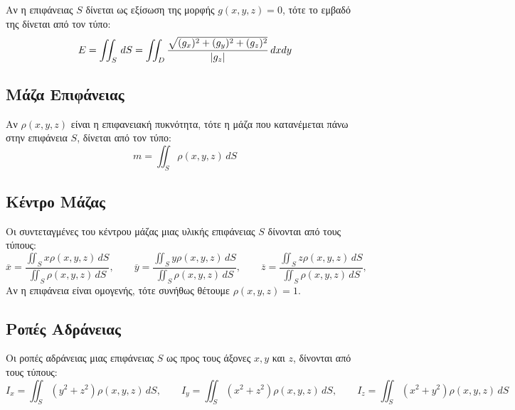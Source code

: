 Αν η επιφάνειας $S$ δίνεται ως εξίσωση της μορφής $ g(x,y,z) = 0 $, τότε το εμβαδό της 
δίνεται από τον τύπο:
\[
  E = \iint_{S} \,{dS} = \iint_{D} \frac{\sqrt{(g_{x})^{2} + (g_{y})^{2}+(g_{z})^{2}}}
  {\abs{g_{z}}} \,{dx} {dy} 
\]

\subsection*{Μάζα Επιφάνειας}

Αν $ \rho (x,y,z) $ είναι η επιφανειακή πυκνότητα, τότε η μάζα που κατανέμεται πάνω 
στην επιφάνεια $S$, δίνεται από τον τύπο:
\[
  m = \iint_{S} \rho (x,y,z) \,{dS}  
\] 

\subsection*{Κέντρο Μάζας}

Οι συντεταγμένες του κέντρου μάζας μιας υλικής επιφάνειας $S$ δίνονται από τους 
τύπους: 
\[
  \overline{x} = \frac{\iint_{S} x \rho (x,y,z) \,{dS}}{\iint_{S} \rho (x,y,z) \,{dS}
  }, \qquad 
  \overline{y} = \frac{\iint_{S} y \rho (x,y,z) \,{dS}}{\iint_{S} \rho (x,y,z) \,{dS}
  }, \qquad
  \overline{z} = \frac{\iint_{S} z \rho (x,y,z) \,{dS}}{\iint_{S} \rho (x,y,z) \,{dS}
  }, \qquad
\]
Αν η επιφάνεια είναι ομογενής, τότε συνήθως θέτουμε $ \rho (x,y,z)=1 $.

\subsection*{Ροπές Αδράνειας}

Οι ροπές αδράνειας μιας επιφάνειας $S$ ως προς τους άξονες $ x,y $ και $z$, δίνονται 
από τους τύπους:
\[
  I_{x} = \iint_{S} (y^{2}+z^{2}) \rho (x,y,z)\,{dS}, \qquad
  I_{y} = \iint_{S} (x^{2}+z^{2}) \rho (x,y,z)\,{dS}, \qquad
  I_{z} = \iint_{S} (x^{2}+y^{2}) \rho (x,y,z)\,{dS}
\] 



